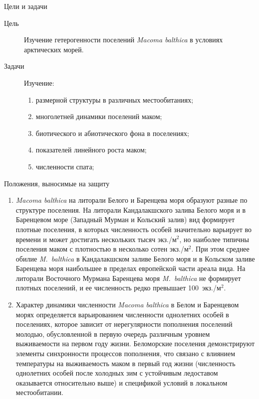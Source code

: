 \documentclass{beamer}
\begin{document}
\begin{frame}{Цели и задачи}
\begin{description}
	\item[Цель] Изучение гетерогенности поселений {\it Macoma balthica} в условиях арктических морей.

	\item[Задачи]  Изучение:
		\begin{enumerate}
    \item размерной структуры в различных местообитаниях; %
    \item многолетней динамики поселений маком;
    \item биотического и абиотического фона в поселениях;
    \item показателей линейного роста маком; %
    \item численности спата; %
		  \end{enumerate}
\end{description}
\end{frame}


\begin{frame}{Положения, выносимые на защиту}
\begin{scriptsize}
\begin{enumerate}
\item \textit{Macoma balthica} на литорали Белого и Баренцева моря образуют разные по структуре поселения.
На литорали Кандалакшского залива Белого моря и в Баренцевом море (Западный Мурман и Кольский залив) вид  формирует плотные поселения, в которых численность особей значительно варьирует во времени и может достигать нескольких тысяч экз./м$^2$, но наиболее типичны поселения маком с плотностью в несколько сотен экз./м$^2$. 
При этом среднее обилие \textit{M.~balthica} в Кандалакшском заливе Белого моря и в Кольском заливе Баренцева моря наибольшее в пределах европейской части ареала вида.
На литорали Восточного Мурмана Баренцева моря \textit{M.~balthica} не формирует плотных поселений, и ее численность редко превышает 100~экз./м$^2$.

\item Характер динамики численности \textit{Macoma balthica} в Белом и Баренцевом морях определяется варьированием численности однолетних особей в поселениях, которое зависит от нерегулярности пополнения поселений молодью, обусловленной в первую очередь различным уровнем выживаемости на первом году жизни.
Беломорские поселения демонстрируют элементы синхронности процессов пополнения, что связано с влиянием температуры на выживаемость маком в первый год жизни  (численность однолетних особей после холодных зим с устойчивым ледоставом оказывается относительно выше) и спецификой условий в локальном местообитании.

\end{enumerate}
\end{scriptsize}
\end{frame}
\end{document}
